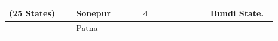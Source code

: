 \begin{longtable}{|p{0.23\linewidth}|p{0.23\linewidth}|p{0.23\linewidth}|p{0.23\linewidth}|}
{(25 States)













} & Sonepur

 & \multirow{25}{*}{









4







































} & \multirow{25}{*}{









Bundi State.







































} \\
\hline
 & Patna


\end{longtable}
